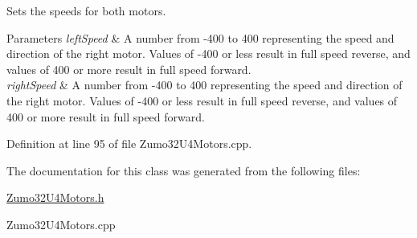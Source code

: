 Sets the speeds for both motors. 


\begin{DoxyParams}{Parameters}
{\em left\+Speed} & A number from -\/400 to 400 representing the speed and direction of the right motor. Values of -\/400 or less result in full speed reverse, and values of 400 or more result in full speed forward. \\
\hline
{\em right\+Speed} & A number from -\/400 to 400 representing the speed and direction of the right motor. Values of -\/400 or less result in full speed reverse, and values of 400 or more result in full speed forward. \\
\hline
\end{DoxyParams}


Definition at line 95 of file Zumo32\+U4\+Motors.\+cpp.



The documentation for this class was generated from the following files\+:\begin{DoxyCompactItemize}
\item 
\hyperlink{_zumo32_u4_motors_8h}{Zumo32\+U4\+Motors.\+h}\item 
Zumo32\+U4\+Motors.\+cpp\end{DoxyCompactItemize}
